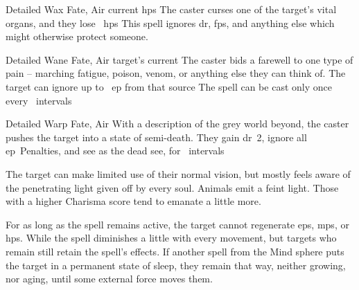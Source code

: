 \ifodd\value{diceNo}
  {Detailed}%
  {Wax}%
  {Fate, Air}%
  {current \glspl{hp}}%
  {The caster curses one of the target's vital organs, and they lose ~\glspl{hp}}%
  {This spell ignores \gls{dr}, \glspl{fp}, and anything else which might otherwise protect someone.}

\else

  {Detailed}%
  {Wane}%
  {Fate, Air}%
  {target's current }%
  {The caster bids a farewell to one type of pain -- marching fatigue, poison, venom, or anything else they can think of.
  The target can ignore up to ~\gls{ep} from that source}%
  {
  The \gls{spell} can be cast only once every ~\glspl{interval}}

  {Detailed}%
  {Warp}%
  {Fate, Air}%
  {}%
  {With a description of the grey world beyond, the caster pushes the target into a state of semi-death.
  They gain \gls{dr}~2, ignore all \gls{ep}~Penalties, and see as the dead see, for ~\glspl{interval}}%
  {
    The target can make limited use of their normal vision, but mostly feels aware of the penetrating light given off by every soul.
    Animals emit a feint light.
    Those with a higher Charisma score tend to emanate a little more.

    For as long as the spell remains active, the target cannot regenerate \glspl{ep}, \glspl{mp}, or \glspl{hp}.
    While the spell diminishes a little with every movement, but targets who remain still retain the spell's effects.
    If another spell from the Mind sphere puts the target in a permanent state of sleep, they remain that way, neither growing, nor aging, until some external force moves them.
  }

\fi
{}
